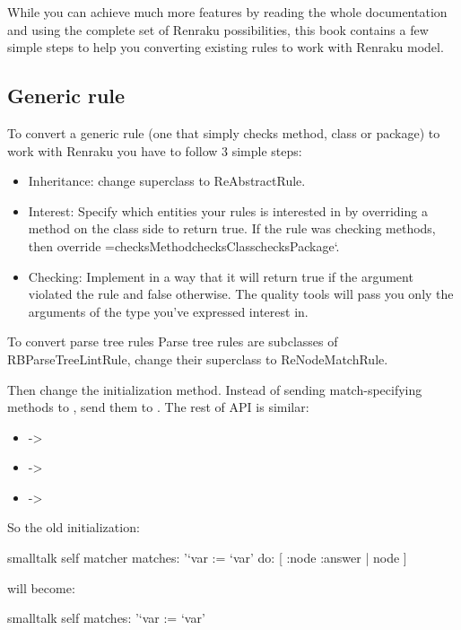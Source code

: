 \documentclass[10pt,twoside,english]{_support/latex/sbabook/sbabook}
\begin{document}
While you can achieve much more features by reading the whole documentation and using the complete set of Renraku possibilities, this book contains a few simple steps to help you converting existing rules to work with Renraku model.

\subsection{Generic rule}
To convert a generic rule (one that simply checks method, class or package) to work with Renraku you have to follow 3 simple steps:

\begin{itemize}
    \item Inheritance: change superclass to ReAbstractRule.
    \item Interest: Specify which entities your rules is interested in by overriding a method on the class side to return true. If the rule was checking methods, then  override =checksMethodchecksClasschecksPackage`.
    \item Checking: Implement  in a way that it will return true if the argument violated the rule and false otherwise. The quality tools will pass you only the arguments of the type you've expressed interest in.
\end{itemize}
To convert parse tree rules
Parse tree rules are subclasses of RBParseTreeLintRule, change their superclass to ReNodeMatchRule.

Then change the initialization method. Instead of sending match-specifying methods to , send them to . The rest of API is similar:

\begin{itemize}
    \item {} -\textgreater{} 
    \item {} -\textgreater{} 
    \item {} -\textgreater{} 
\end{itemize}

So the old initialization:
\begin{displaycode}{smalltalk}
self matcher 
	matches: '`var := `var'
	do: [ :node :answer | node ]
\end{displaycode}

will become:
\begin{displaycode}{smalltalk}
self matches: '`var := `var'
\end{displaycode}
\end{document}
